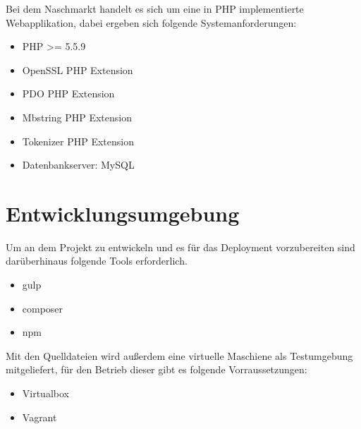 Bei dem Naschmarkt handelt es sich um eine in PHP implementierte Webapplikation, dabei ergeben sich folgende Systemanforderungen:
\begin{itemize}
    \item PHP\cite{php} >= 5.5.9
    \item OpenSSL PHP Extension
    \item PDO PHP Extension
    \item Mbstring PHP Extension
    \item Tokenizer PHP Extension
    \item Datenbankserver: MySQL\cite{mysql}
\end{itemize}

\section{Entwicklungsumgebung}
Um an dem Projekt zu entwickeln und es f\"ur das Deployment vorzubereiten sind dar\"uberhinaus folgende Tools erforderlich.
\begin{itemize}
    \item gulp\cite{gulp}
    \item composer\cite{composer}
    \item npm\cite{npm}
\end{itemize}

Mit den Quelldateien wird au\ss erdem eine virtuelle Maschiene als Testumgebung mitgeliefert, f\"ur den Betrieb dieser gibt es folgende Vorraussetzungen:
\begin{itemize}
    \item Virtualbox\cite{virtualbox}
    \item Vagrant\cite{vagrant}
\end{itemize}
